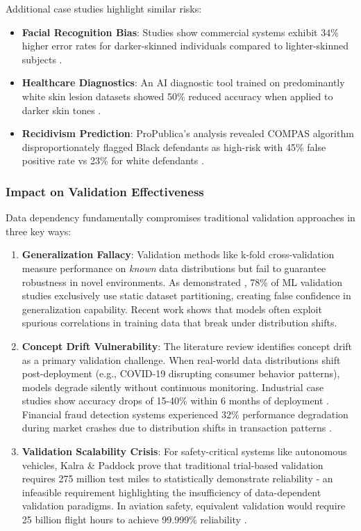 \documentclass[manuscript,screen,review]{acmart}
\begin{document}
Additional case studies highlight similar risks:
\begin{itemize}
    \item \textbf{Facial Recognition Bias}: Studies show commercial systems exhibit 34\% higher error rates for darker-skinned individuals compared to lighter-skinned subjects .
    \item \textbf{Healthcare Diagnostics}: An AI diagnostic tool trained on predominantly white skin lesion datasets showed 50\% reduced accuracy when applied to darker skin tones .
    \item \textbf{Recidivism Prediction}: ProPublica's analysis revealed COMPAS algorithm disproportionately flagged Black defendants as high-risk with 45\% false positive rate vs 23\% for white defendants .
\end{itemize}

\subsubsection{Impact on Validation Effectiveness}

Data dependency fundamentally compromises traditional validation approaches in three key ways:

\begin{enumerate}
    \item \textbf{Generalization Fallacy}: Validation methods like k-fold cross-validation measure performance on \textit{known} data distributions but fail to guarantee robustness in novel environments. As demonstrated , 78\% of ML validation studies exclusively use static dataset partitioning, creating false confidence in generalization capability. Recent work shows that models often exploit spurious correlations in training data that break under distribution shifts.
    
    \item \textbf{Concept Drift Vulnerability}: The literature review identifies concept drift as a primary validation challenge. When real-world data distributions shift post-deployment (e.g., COVID-19 disrupting consumer behavior patterns), models degrade silently without continuous monitoring. Industrial case studies show accuracy drops of 15-40\% within 6 months of deployment . Financial fraud detection systems experienced 32\% performance degradation during market crashes due to distribution shifts in transaction patterns .
    
    \item \textbf{Validation Scalability Crisis}: For safety-critical systems like autonomous vehicles, Kalra \& Paddock  prove that traditional trial-based validation requires 275 million test miles to statistically demonstrate reliability - an infeasible requirement highlighting the insufficiency of data-dependent validation paradigms. In aviation safety, equivalent validation would require 25 billion flight hours to achieve 99.999\% reliability .
\end{enumerate}
\end{document}

